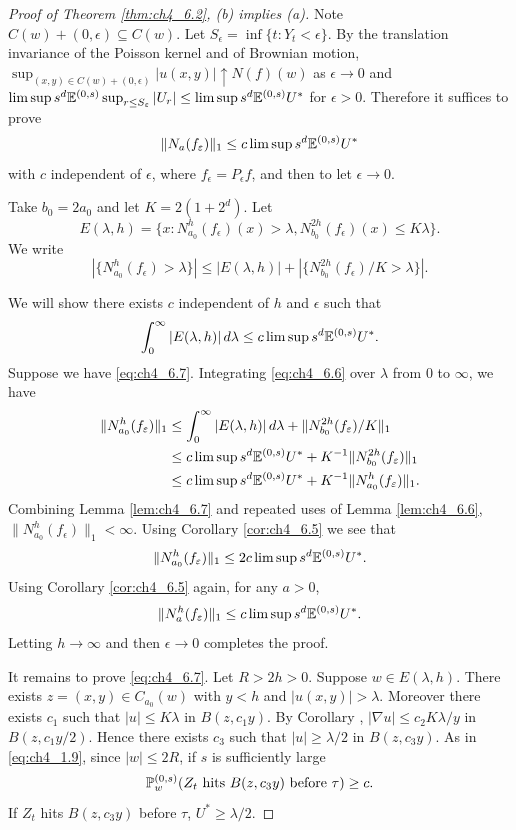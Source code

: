 \begin{proof}[Proof of Theorem \ref{thm:ch4_6.2}, (b) implies (a)]
Note $C(w) + (0,\epsilon) \subseteq C(w)$. Let $S_\epsilon = \inf\{t : Y_t < \epsilon\}$. By the translation invariance of the Poisson kernel and of Brownian motion, $\sup_{(x,y)\in C(w)+(0,\epsilon)} |u(x,y)| \uparrow N(f)(w)$ as $\epsilon \to 0$ and $\limsup s^d\E^{(0,s)}\sup_{r\leq S_\epsilon} |U_r| \leq \limsup s^d\E^{(0,s)}U^*$ for $\epsilon > 0$. Therefore it suffices to prove
\[
    \|N_a(f_\epsilon)\|_1 \leq c\limsup s^d\E^{(0,s)}U^*
\]
with $c$ independent of $\epsilon$, where $f_\epsilon = P_\epsilon f$, and then to let $\epsilon \to 0$.

Take $b_0 = 2a_0$ and let $K = 2(1+2^d)$. Let
\[
    E(\lambda,h) = \{x : N_{a_0}^h(f_\epsilon)(x) > \lambda, N_{b_0}^{2h}(f_\epsilon)(x) \leq K\lambda\}.
\]
We write
\begin{equation}\label{eq:ch4_6.6}
    |\{N_{a_0}^h(f_\epsilon) > \lambda\}| \leq |E(\lambda,h)| + |\{N_{b_0}^{2h}(f_\epsilon)/K > \lambda\}|.
\end{equation}

We will show there exists $c$ independent of $h$ and $\epsilon$ such that
\begin{equation}\label{eq:ch4_6.7}
    \int_0^\infty |E(\lambda,h)|\,d\lambda \leq c\limsup s^d\E^{(0,s)}U^*.
\end{equation}
Suppose we have \eqref{eq:ch4_6.7}. Integrating \eqref{eq:ch4_6.6} over $\lambda$ from $0$ to $\infty$, we have
\begin{align*}
    \|N_{a_0}^h(f_\epsilon)\|_1 &\leq \int_0^\infty |E(\lambda,h)|\,d\lambda + \|N_{b_0}^{2h}(f_\epsilon)/K\|_1 \\
    &\leq c\limsup s^d\E^{(0,s)}U^* + K^{-1}\|N_{b_0}^{2h}(f_\epsilon)\|_1 \\
    &\leq c\limsup s^d\E^{(0,s)}U^* + K^{-1}\|N_{a_0}^h(f_\epsilon)\|_1.
\end{align*}
Combining Lemma \ref{lem:ch4_6.7} and repeated uses of Lemma \ref{lem:ch4_6.6}, $\|N_{a_0}^h(f_\epsilon)\|_1 < \infty$. Using Corollary \ref{cor:ch4_6.5} we see that
\[
    \|N_{a_0}^h(f_\epsilon)\|_1 \leq 2c\limsup s^d\E^{(0,s)}U^*.
\]
Using Corollary \ref{cor:ch4_6.5} again, for any $a > 0$,
\[
    \|N_a^h(f_\epsilon)\|_1 \leq c\limsup s^d\E^{(0,s)}U^*.
\]
Letting $h \to \infty$ and then $\epsilon \to 0$ completes the proof.

It remains to prove \eqref{eq:ch4_6.7}. Let $R > 2h > 0$. Suppose $w \in E(\lambda,h)$. There exists $z = (x,y) \in C_{a_0}(w)$ with $y < h$ and $|u(x,y)| > \lambda$. Moreover there exists $c_1$ such that $|u| \leq K\lambda$ in $B(z,c_1y)$. By Corollary , $|\nabla u| \leq c_2K\lambda/y$ in $B(z,c_1y/2)$. Hence there exists $c_3$ such that $|u| \geq \lambda/2$ in $B(z,c_3y)$. As in \eqref{eq:ch4_1.9}, since $|w| \leq 2R$, if $s$ is sufficiently large
\[
    \P_w^{(0,s)}(Z_t~\text{hits}~B(z,c_3y)~\text{before}~ \tau) \geq c.
\]
If $Z_t$ hits $B(z,c_3y)$ before $\tau$, $U^* \geq \lambda/2$.


\end{proof}
